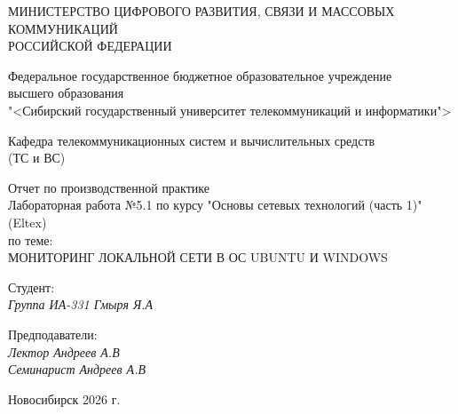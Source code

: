 \thispagestyle{empty}

\begin{center}
    МИНИСТЕРСТВО ЦИФРОВОГО РАЗВИТИЯ, СВЯЗИ И МАССОВЫХ КОММУНИКАЦИЙ \\ РОССИЙСКОЙ ФЕДЕРАЦИИ

    \vspace{20pt}

    Федеральное государственное бюджетное образовательное учреждение  \\  высшего образования \\
    "<Сибирский государственный университет телекоммуникаций и информатики"> \\

    \vspace{20pt}

    Кафедра телекоммуникационных систем и вычислительных средств \\  (ТС и ВС)
\end{center}

\vfill

\begin{center}
    Отчет по производственной практике \\  
    Лабораторная работа №5.1 по курсу "Основы сетевых технологий (часть 1)" (Eltex) \\
    \vspace{20pt}
    по теме: \\
    \uppercase{Мониторинг локальной сети в ОС Ubuntu и Windows}
\end{center}

\vfill

    \noindent Студент: \\
    \textit{Группа ИА-331 \hfill Гмыря Я.А}

    \vspace{20pt}

    \noindent Предподаватели: \\
    \textit{Лектор \hfill Андреев А.В} \\
    \textit{Семинарист \hfill Андреев А.В}

\vfill

\begin{center}
    Новосибирск 2026 г.
\end{center}